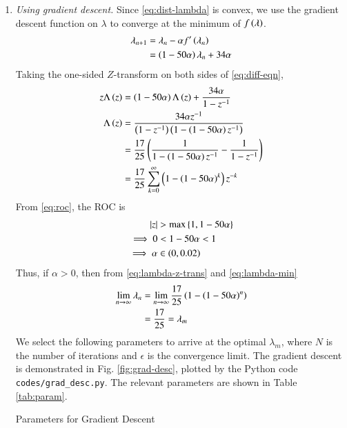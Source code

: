 \documentclass[journal,12pt,twocolumn]{IEEEtran}
\begin{document}
\begin{enumerate}
\begin{enumerate}
        \item \textit{Using gradient descent.} Since \eqref{eq:dist-lambda} is
        convex, we use the gradient descent function on $\lambda$ to converge at
        the minimum of $f\left(\lambda\right)$.
        \begin{align}
            \lambda_{n+1} &= \lambda_n - \alpha f'\left(\lambda_n\right) \\
                          &= \left(1-50\alpha\right)\lambda_n + 34\alpha
                          \label{eq:diff-eqn}
        \end{align}
        Taking the one-sided $Z$-transform on both sides of \eqref{eq:diff-eqn},
        \begin{align}
            z\Lambda\left(z\right) &= \left(1-50\alpha\right)\Lambda\left(z\right) + \frac{34\alpha}{1-z^{-1}} \\
            \Lambda\left(z\right) &= \frac{34\alpha z^{-1}}{\left(1- z^{-1}\right)\left(1 - \left(1-50\alpha\right)z^{-1}\right)} \label{eq:roc} \\
                                     &= \frac{17}{25}\left(\frac{1}{1-\left(1-50\alpha\right)z^{-1}}-\frac{1}{1-z^{-1}}\right) \\
                                     &= \frac{17}{25}\sum_{k=0}^{\infty}\left(1-\left(1-50\alpha\right)^k\right)z^{-k}
                                     \label{eq:lambda-z-trans}
        \end{align}
        From \eqref{eq:roc}, the ROC is
        \begin{align}
            \left\vert z\right\vert &> \max\left\{1,1-50\alpha\right\} \\
            \implies 0 &< 1 - 50\alpha < 1 \\
            \implies \alpha &\in \left(0,0.02\right)
            \label{eq:alpha-constr}
        \end{align}
        Thus, if $\alpha > 0$, then from \eqref{eq:lambda-z-trans} and \eqref{eq:lambda-min}
        \begin{align}
            \lim_{n\to\infty}\lambda_n &= \lim_{n\to\infty}\frac{17}{25}\left(1-\left(1-50\alpha\right)^n\right) \\
                                       &= \frac{17}{25} = \lambda_m
                                       \label{eq:conv}
        \end{align}
        We select the following parameters to arrive at the optimal $\lambda_m$,
        where $N$ is the number of iterations and $\epsilon$ is the convergence 
        limit. The gradient descent is demonstrated in Fig. \ref{fig:grad-desc},
        plotted by the Python code \texttt{codes/grad\_desc.py}. The relevant
        parameters are shown in Table \ref{tab:param}.
        \begin{table}[!ht]
            \centering
            
            \caption{Parameters for Gradient Descent}
            \label{tab:param}
        \end{table}


\end{enumerate}
\end{enumerate}
\end{document}
